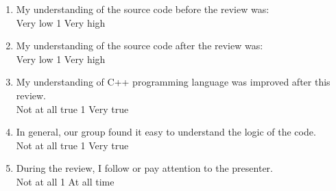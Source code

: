 \noindent
\begin {enumerate}
\item My understanding of the source code before the review was:
\\
Very low \hfill 1     \hfill Very high\\

\item My understanding of the source code after the review was:
\\
Very low \hfill 1     \hfill Very high\\

\item My understanding of C++ programming language was
improved after this review.
\\
Not at all true \hfill 1     \hfill Very true\\



\item In general, our group found it easy to understand the logic of the
code.
\\
Not at all true \hfill 1     \hfill Very true\\

\item During the review, I follow or pay attention to the presenter.
\\
Not at all \hfill 1    
\hfill At all time\\





\end{enumerate}
